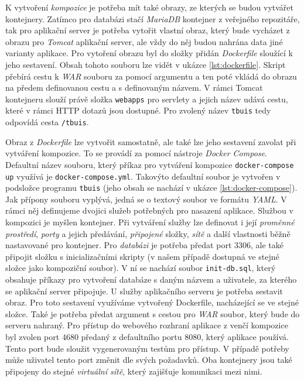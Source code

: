 \documentclass[czech, ma, kiv, he, iso690alph, pdf, viewonly]{fasthesis}
\begin{document}
    K vytvoření \textit{kompozice} je potřeba mít také obrazy, ze kterých se budou vytvářet kontejnery. Zatímco pro databázi stačí \textit{MariaDB} kontejner z veřejného repozitáře, tak pro aplikační server je potřeba vytořit vlastní obraz, který bude vycházet z obrazu pro \textit{Tomcat} aplikační server, ale vždy do něj budou nahrána data jiné varianty aplikace. Pro vytoření obrazu byl do složky přidán \textit{Dockerfile} sloužící k jeho sestavení. Obsah tohoto souboru lze vidět v ukázce \ref{lst:dockerfile}. Skript přebírá cestu k \textit{WAR} souboru za pomocí argumentu a ten poté vkládá do obrazu na předem definovanou cestu a s definovaným názvem. V rámci Tomcat kontejneru slouží právě složka \verb|webapps| pro servlety a jejich název udává cestu, které v rámci HTTP dotazů jsou dostupné. Pro zvolený název \verb|tbuis| tedy odpovídá cesta \verb|/tbuis|.


    Obraz z \textit{Dockerfile} lze vytvořit samostatně, ale také lze jeho sestavení zavolat při vytváření kompozice. To se provádí za pomocí nástroje \textit{Docker Compose}. Defaultní název souboru, který příkaz pro vytváření kompozice \verb|docker-compose up| využívá je \verb|docker-compose.yml|. Takovýto defaultní soubor je vytvořen v podsložce programu \verb|tbuis| (jeho obsah se nachází v ukázce \ref{lst:docker-compose}). Jak přípony souboru vyplývá, jedná se o textový soubor ve formátu \textit{YAML}. V rámci něj definujeme dvojici služeb potřebných pro nasazení aplikace. Službou v kompozici je myšlen kontejner. Při vytváření služby lze definovat i její \textit{proměnné prostředí}, \textit{porty} a jejich předávání, \textit{připojené} složky, \textit{sítě} a další vlastnosti běžně nastavované pro kontejner. Pro \textit{databázi} je potřeba předat port \(3306\), ale také připojit složku s inicializačními skripty (v našem případě dostupná ve stejné složce jako kompoziční soubor). V ní se nachází soubor \verb|init-db.sql|, který obsahuje příkazy pro vytvoření databáze s daným názvem a uživatele, za kterého se aplikační server připojuje. U služby aplikačního serveru je potřeba sestavit obraz. Pro toto sestavení využíváme vytvořený Dockerfile, nacházející se ve stejné složce. Také je potřeba předat argument s cestou pro \textit{WAR} soubor, který bude do serveru nahraný. Pro přístup do webového rozhraní aplikace z venčí kompozice byl zvolen port \(4680\) předaný z defaultního portu \(8080\), který aplikace používá. Tento port bude sloužit vygenerovaným testům pro přístup. V případě potřeby může uživatel tento port změnit dle svých požadavků. Oba kontejnery jsou také připojeny do stejné \textit{virtuální sítě}, který zajišťuje komunikaci mezi nimi. 
\end{document}
